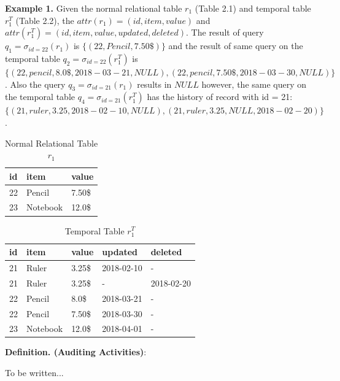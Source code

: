 \textbf{Example 1.} Given the normal relational table $r_1$ (Table 2.1) and temporal table $r_1^T$ (Table 2.2), the $attr(r_1) = (id, item, value)$ and $attr(r_1^T)= (id, item, value, updated, deleted)$. The result of query $q_1 = \sigma_{id = 22}(r_1)$ is $\{(22,Pencil,7.50\$)\}$ and the result of same query on the temporal table $q_2 = \sigma_{id = 22}(r_1^T)$ is $\{(22,pencil,8.0\$,2018-03-21,NULL),(22,pencil,7.50\$,2018-03-30,NULL)\}$. Also the query $q_3 = \sigma_{id = 21}(r_1)$ results in $NULL$ however, the same query on the temporal table $q_4 = \sigma_{id = 21}(r_1^T)$ has the history of record with id = 21: $\{(21,ruler,3.25,2018-02-10,NULL),(21,ruler,3.25,NULL,2018-02-20)\}$.
\begin{center}

\begin{table}[t]
	\centering
	\caption{Normal Relational Table $r_1$}
	\begin{tabular}{p{4cm}p{4cm}p{4cm}}
		\hline
		id & item      & value  \\ \hline
		22 & Pencil    & 7.50\$ \\
		23 & Notebook & 12.0\$   \\ \hline
	\end{tabular}
\end{table}

\begin{table}[t]
	\centering
	\caption{Temporal Table $r_1^T$}
	\begin{tabular}{p{1cm}p{2cm}p{3cm}p{3cm}p{2cm}}
		\hline
		id & item      & value  & updated  & deleted\\ \hline
		21 & Ruler    & 3.25\$  & 2018-02-10  &  - \\  
		21 & Ruler    & 3.25\$  & -  &  2018-02-20 \\
		22 & Pencil    & 8.0\$  & 2018-03-21  &  - \\
		22 & Pencil    & 7.50\$  & 2018-03-30  &  -\\
		23 & Notebook & 12.0\$  & 2018-04-01 & - \\ \hline
	\end{tabular}
\end{table} 
\end{center}

\textbf{Definition. (Auditing Activities)}:
\begin{info} \color{red} To be written... \end{info}

